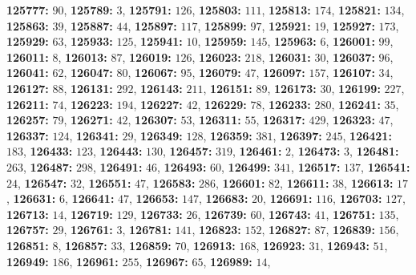 \textsf{\bfseries 125777:} $90$, \textsf{\bfseries 125789:} $3$, \textsf{\bfseries 125791:} $126$, \textsf{\bfseries 125803:} $111$, \textsf{\bfseries 125813:} $174$, \textsf{\bfseries 125821:} $134$, \textsf{\bfseries 125863:} $39$, \textsf{\bfseries 125887:} $44$, \textsf{\bfseries 125897:} $117$, \textsf{\bfseries 125899:} $97$, \textsf{\bfseries 125921:} $19$, \textsf{\bfseries 125927:} $173$, \textsf{\bfseries 125929:} $63$, \textsf{\bfseries 125933:} $125$, \textsf{\bfseries 125941:} $10$, \textsf{\bfseries 125959:} $145$, \textsf{\bfseries 125963:} $6$, \textsf{\bfseries 126001:} $99$, \textsf{\bfseries 126011:} $8$, \textsf{\bfseries 126013:} $87$, \textsf{\bfseries 126019:} $126$, \textsf{\bfseries 126023:} $218$, \textsf{\bfseries 126031:} $30$, \textsf{\bfseries 126037:} $96$, \textsf{\bfseries 126041:} $62$, \textsf{\bfseries 126047:} $80$, \textsf{\bfseries 126067:} $95$, \textsf{\bfseries 126079:} $47$, \textsf{\bfseries 126097:} $157$, \textsf{\bfseries 126107:} $34$, \textsf{\bfseries 126127:} $88$, \textsf{\bfseries 126131:} $292$, \textsf{\bfseries 126143:} $211$, \textsf{\bfseries 126151:} $89$, \textsf{\bfseries 126173:} $30$, \textsf{\bfseries 126199:} $227$, \textsf{\bfseries 126211:} $74$, \textsf{\bfseries 126223:} $194$, \textsf{\bfseries 126227:} $42$, \textsf{\bfseries 126229:} $78$, \textsf{\bfseries 126233:} $280$, \textsf{\bfseries 126241:} $35$, \textsf{\bfseries 126257:} $79$, \textsf{\bfseries 126271:} $42$, \textsf{\bfseries 126307:} $53$, \textsf{\bfseries 126311:} $55$, \textsf{\bfseries 126317:} $429$, \textsf{\bfseries 126323:} $47$, \textsf{\bfseries 126337:} $124$, \textsf{\bfseries 126341:} $29$, \textsf{\bfseries 126349:} $128$, \textsf{\bfseries 126359:} $381$, \textsf{\bfseries 126397:} $245$, \textsf{\bfseries 126421:} $183$, \textsf{\bfseries 126433:} $123$, \textsf{\bfseries 126443:} $130$, \textsf{\bfseries 126457:} $319$, \textsf{\bfseries 126461:} $2$, \textsf{\bfseries 126473:} $3$, \textsf{\bfseries 126481:} $263$, \textsf{\bfseries 126487:} $298$, \textsf{\bfseries 126491:} $46$, \textsf{\bfseries 126493:} $60$, \textsf{\bfseries 126499:} $341$, \textsf{\bfseries 126517:} $137$, \textsf{\bfseries 126541:} $24$, \textsf{\bfseries 126547:} $32$, \textsf{\bfseries 126551:} $47$, \textsf{\bfseries 126583:} $286$, \textsf{\bfseries 126601:} $82$, \textsf{\bfseries 126611:} $38$, \textsf{\bfseries 126613:} $17$, \textsf{\bfseries 126631:} $6$, \textsf{\bfseries 126641:} $47$, \textsf{\bfseries 126653:} $147$, \textsf{\bfseries 126683:} $20$, \textsf{\bfseries 126691:} $116$, \textsf{\bfseries 126703:} $127$, \textsf{\bfseries 126713:} $14$, \textsf{\bfseries 126719:} $129$, \textsf{\bfseries 126733:} $26$, \textsf{\bfseries 126739:} $60$, \textsf{\bfseries 126743:} $41$, \textsf{\bfseries 126751:} $135$, \textsf{\bfseries 126757:} $29$, \textsf{\bfseries 126761:} $3$, \textsf{\bfseries 126781:} $141$, \textsf{\bfseries 126823:} $152$, \textsf{\bfseries 126827:} $87$, \textsf{\bfseries 126839:} $156$, \textsf{\bfseries 126851:} $8$, \textsf{\bfseries 126857:} $33$, \textsf{\bfseries 126859:} $70$, \textsf{\bfseries 126913:} $168$, \textsf{\bfseries 126923:} $31$, \textsf{\bfseries 126943:} $51$, \textsf{\bfseries 126949:} $186$, \textsf{\bfseries 126961:} $255$, \textsf{\bfseries 126967:} $65$, \textsf{\bfseries 126989:} $14$, 
